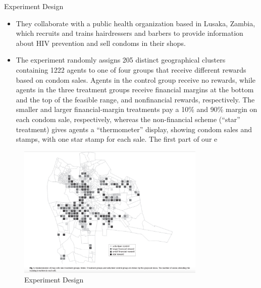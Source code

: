 \documentclass{beamer}
\begin{document}
\begin{frame}[allowframebreaks]{Experiment Design}
    \begin{itemize}
        \item They  collaborate with a public health organization
        based in Lusaka, Zambia, which recruits and trains hairdressers and
        barbers to provide information about HIV prevention and sell condoms
        in their shops.
        \item The experiment randomly assigns 205 distinct geographical clusters
        containing 1222 agents to one of four groups that receive different
        rewards based on condom sales. Agents in the control group receive no
        rewards, while agents in the three treatment groups receive financial
        margins at the bottom and the top of the feasible range, and nonfinancial rewards, respectively. The smaller and larger financial-margin
        treatments pay a 10\% and 90\% margin on each condom sale, respectively,
        whereas the non-financial scheme (“star” treatment) gives agents a
        “thermometer” display, showing condom sales and stamps, with one
        star stamp for each sale.
        The first part of our e
        
    \end{itemize}
  
\begin{figure}
    \centering
    \includegraphics[width=0.8\textwidth]{F1.png}
    \caption{Experiment Design}
    \label{fig:my_label}
\end{figure}
\end{frame}
\end{document}
